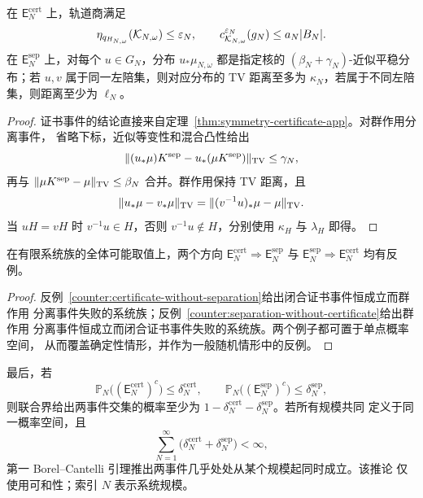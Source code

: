 \begin{theorem}[两类事件分别蕴含的结论]
\label{thm:two-events}
在 $\mathsf E_N^{\mathrm{cert}}$ 上，轨道商满足
\[
\eta_{q_{H_{N,\omega}}}(\mathcal K_{N,\omega})\le\varepsilon_N,
\qquad
c_{\mathcal K_{N,\omega}}^{\varepsilon_N}(g_N)\le a_N|B_N|.
\]
在 $\mathsf E_N^{\mathrm{sep}}$ 上，对每个 $u\in G_N$，分布
$u_*\mu_{N,\omega}$ 都是指定核的
$(\beta_N+\gamma_N)$-近似平稳分布；若 $u,v$ 属于同一左陪集，则对应分布的
TV 距离至多为 $\kappa_N$，若属于不同左陪集，则距离至少为 $\ell_N$。
\end{theorem}

\begin{proof}
证书事件的结论直接来自定理~\ref{thm:symmetry-certificate-app}。对群作用分离事件，
省略下标，近似等变性和混合凸性给出
\[
\|(u_*\mu)K^{\mathrm{sep}}-u_*(\mu K^{\mathrm{sep}})\|_{\operatorname{TV}}
\le\gamma_N,
\]
再与
$\|\mu K^{\mathrm{sep}}-\mu\|_{\operatorname{TV}}\le\beta_N$ 合并。群作用保持 TV
距离，且
\[
\|u_*\mu-v_*\mu\|_{\operatorname{TV}}
=\|(v^{-1}u)_*\mu-\mu\|_{\operatorname{TV}}.
\]
当 $uH=vH$ 时 $v^{-1}u\in H$，否则 $v^{-1}u\notin H$，分别使用
$\kappa_H$ 与 $\lambda_H$ 即得。
\end{proof}

\begin{proposition}[两类事件的双向反例]
\label{prop:cert-separation-nonimplication}
在有限系统族的全体可能取值上，两个方向
$\mathsf E_N^{\mathrm{cert}}\Rightarrow\mathsf E_N^{\mathrm{sep}}$ 与
$\mathsf E_N^{\mathrm{sep}}\Rightarrow\mathsf E_N^{\mathrm{cert}}$ 均有反例。
\end{proposition}

\begin{proof}
反例~\ref{counter:certificate-without-separation}给出闭合证书事件恒成立而群作用
分离事件失败的系统族；反例~\ref{counter:separation-without-certificate}给出群作用
分离事件恒成立而闭合证书事件失败的系统族。两个例子都可置于单点概率空间，
从而覆盖确定性情形，并作为一般随机情形中的反例。
\end{proof}

最后，若
\[
\mathbb P_N\bigl((\mathsf E_N^{\mathrm{cert}})^c\bigr)
\le\delta_N^{\mathrm{cert}},
\qquad
\mathbb P_N\bigl((\mathsf E_N^{\mathrm{sep}})^c\bigr)
\le\delta_N^{\mathrm{sep}},
\]
则联合界给出两事件交集的概率至少为
$1-\delta_N^{\mathrm{cert}}-\delta_N^{\mathrm{sep}}$。若所有规模共同
定义于同一概率空间，且
\[
\sum_{N=1}^{\infty}
\bigl(\delta_N^{\mathrm{cert}}+\delta_N^{\mathrm{sep}}\bigr)<\infty,
\]
第一 Borel--Cantelli 引理\citep{Kallenberg2021}推出两事件几乎处处从某个规模起同时成立。该推论
仅使用可和性；索引 $N$ 表示系统规模。
